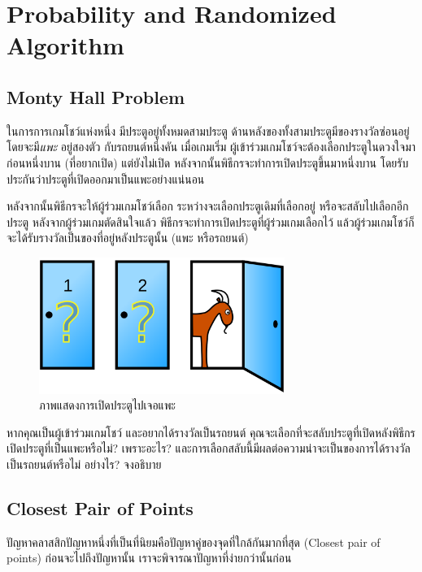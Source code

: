 \chapter{Probability and Randomized Algorithm}

\section{Monty Hall Problem}

ในการการเกมโชว์แห่งหนึ่ง มีประตูอยู่ทั้งหมดสามประตู ด้านหลังของทั้งสามประตูมีของรางวัลซ่อนอยู่ โดยจะมี\emph{แพะ} อยู่สองตัว กับรถยนต์หนึ่งคัน เมื่อเกมเริ่ม ผู้เข้าร่วมเกมโชว์จะต้องเลือกประตูในดวงใจมาก่อนหนึ่งบาน (ที่อยากเปิด) แต่ยังไม่เปิด หลังจากนั้นพิธีกรจะทำการเปิดประตูขึ้นมาหนึ่งบาน โดยรับประกันว่าประตูที่เปิดออกมาเป็นแพะอย่างแน่นอน

หลังจากนั้นพิธีกรจะให้ผู้ร่วมเกมโชว์เลือก ระหว่างจะเลือกประตูเดิมที่เลือกอยู่ หรือจะสลับไปเลือกอีกประตู หลังจากผู้ร่วมเกมตัดสินใจแล้ว พิธีกรจะทำการเปิดประตูที่ผู้ร่วมเกมเลือกไว้ แล้วผู้ร่วมเกมโชว์ก็จะได้รับรางวัลเป็นของที่อยู่หลังประตูนั้น (แพะ หรือรถยนต์)

\begin{figure}[htbp]
    \centering
    \includegraphics[width=8cm]{chapters/montyhall.png}
    \caption{ภาพแสดงการเปิดประตูไปเจอแพะ}
    \label{fig:montyhall}
\end{figure}

\begin{exercise}
หากคุณเป็นผู้เข้าร่วมเกมโชว์ และอยากได้รางวัลเป็นรถยนต์ คุณจะเลือกที่จะสลับประตูที่เปิดหลังพิธีกรเปิดประตูที่เป็นแพะหรือไม่? เพราะอะไร? และการเลือกสลับนี้มีผลต่อความน่าจะเป็นของการได้รางวัลเป็นรถยนต์หรือไม่ อย่างไร? จงอธิบาย
\end{exercise}

\section{Closest Pair of Points}

ปัญหาคลาสสิกปัญหาหนึ่งที่เป็นที่นิยมคือปัญหาคู่ของจุดที่ใกล้กันมากที่สุด (Closest pair of points) ก่อนจะไปถึงปัญหานั้น เราจะพิจารณาปัญหาที่ง่ายกว่านั้นก่อน

